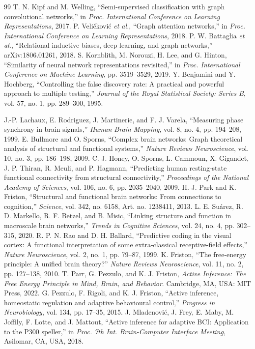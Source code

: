 \documentclass[journal]{IEEEtran}
\begin{document}
\begin{thebibliography}{99}
 T. N. Kipf and M. Welling, ``Semi-supervised classification with graph convolutional networks,'' in \emph{Proc. International Conference on Learning Representations}, 2017.
 P. Veli\v{c}kovi\'{c} \emph{et al.}, ``Graph attention networks,'' in \emph{Proc. International Conference on Learning Representations}, 2018.
 P. W. Battaglia \emph{et al.}, ``Relational inductive biases, deep learning, and graph networks,'' arXiv:1806.01261, 2018.
 S. Kornblith, M. Norouzi, H. Lee, and G. Hinton, ``Similarity of neural network representations revisited,'' in \emph{Proc. International Conference on Machine Learning}, pp. 3519--3529, 2019.
 Y. Benjamini and Y. Hochberg, ``Controlling the false discovery rate: A practical and powerful approach to multiple testing,'' \emph{Journal of the Royal Statistical Society: Series B}, vol. 57, no. 1, pp. 289--300, 1995.




 J.-P. Lachaux, E. Rodriguez, J. Martinerie, and F. J. Varela, ``Measuring phase synchrony in brain signals,'' \emph{Human Brain Mapping}, vol. 8, no. 4, pp. 194--208, 1999.
 E. Bullmore and O. Sporns, ``Complex brain networks: Graph theoretical analysis of structural and functional systems,'' \emph{Nature Reviews Neuroscience}, vol. 10, no. 3, pp. 186--198, 2009.
 C. J. Honey, O. Sporns, L. Cammoun, X. Gigandet, J. P. Thiran, R. Meuli, and P. Hagmann, ``Predicting human resting-state functional connectivity from structural connectivity,'' \emph{Proceedings of the National Academy of Sciences}, vol. 106, no. 6, pp. 2035--2040, 2009.
 H.-J. Park and K. Friston, ``Structural and functional brain networks: From connections to cognition,'' \emph{Science}, vol. 342, no. 6158, Art. no. 1238411, 2013.
 L. E. Su\'arez, R. D. Markello, R. F. Betzel, and B. Misic, ``Linking structure and function in macroscale brain networks,'' \emph{Trends in Cognitive Sciences}, vol. 24, no. 4, pp. 302--315, 2020.
 R. P. N. Rao and D. H. Ballard, ``Predictive coding in the visual cortex: A functional interpretation of some extra-classical receptive-field effects,'' \emph{Nature Neuroscience}, vol. 2, no. 1, pp. 79--87, 1999.
 K. Friston, ``The free-energy principle: A unified brain theory?'' \emph{Nature Reviews Neuroscience}, vol. 11, no. 2, pp. 127--138, 2010.
 T. Parr, G. Pezzulo, and K. J. Friston, \emph{Active Inference: The Free Energy Principle in Mind, Brain, and Behavior}. Cambridge, MA, USA: MIT Press, 2022.
 G. Pezzulo, F. Rigoli, and K. J. Friston, ``Active inference, homeostatic regulation and adaptive behavioural control,'' \emph{Progress in Neurobiology}, vol. 134, pp. 17--35, 2015.
 J. Mladenovi\'{c}, J. Frey, E. Maby, M. Joffily, F. Lotte, and J. Mattout, ``Active inference for adaptive BCI: Application to the P300 speller,'' in \emph{Proc. 7th Int. Brain-Computer Interface Meeting}, Asilomar, CA, USA, 2018.


\end{thebibliography}
\end{document}
